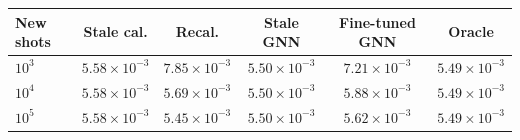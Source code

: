 \begin{tabular}{lccccc}
\toprule
New shots & Stale cal. & Recal. & Stale GNN & Fine-tuned GNN & Oracle \\
\midrule
$10^{3}$ & $5.58\times10^{-3}$ & $7.85\times10^{-3}$ & $5.50\times10^{-3}$ & $7.21\times10^{-3}$ & $5.49\times10^{-3}$ \\
$10^{4}$ & $5.58\times10^{-3}$ & $5.69\times10^{-3}$ & $5.50\times10^{-3}$ & $5.88\times10^{-3}$ & $5.49\times10^{-3}$ \\
$10^{5}$ & $5.58\times10^{-3}$ & $5.45\times10^{-3}$ & $5.50\times10^{-3}$ & $5.62\times10^{-3}$ & $5.49\times10^{-3}$ \\
\bottomrule
\end{tabular}
